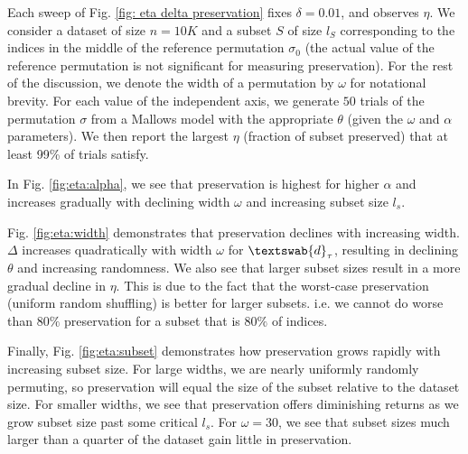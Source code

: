 Each sweep of Fig. \ref{fig: eta delta preservation} fixes $\delta = 0.01$, and observes $\eta$. We consider a dataset of size $n = 10K$ and a subset $S$ of size $l_S$ corresponding to the indices in the middle of the reference permutation $\sigma_0$ (the actual value of the reference permutation is not significant for measuring preservation). For the rest of the discussion, we denote the width of a permutation by $\omega$ for notational brevity. For each value of the independent axis, we generate $50$ trials of the permutation $\sigma$ from a Mallows model with the appropriate $\theta$ (given the $\omega$ and $\alpha$ parameters). We then report the largest $\eta$ (fraction of subset preserved) that at least 99\% of trials satisfy. 

In Fig. \ref{fig:eta:alpha}, we see that preservation is highest for higher $\alpha$ and increases gradually with declining width $\omega$ and increasing subset size $l_s$. 

Fig. \ref{fig:eta:width} demonstrates that preservation declines with increasing width. $\Delta$ increases quadratically with width $\omega$ for $\textswab{d}_\tau$, resulting in declining $\theta$ and increasing randomness. We also see that larger subset sizes result in a more gradual decline in $\eta$. This is due to the fact that the worst-case preservation (uniform random shuffling) is better for larger subsets. i.e. we cannot do worse than $80\%$ preservation for a subset that is $80\%$ of indices. 

Finally, Fig. \ref{fig:eta:subset} demonstrates how preservation grows rapidly with increasing subset size. For large widths, we are nearly uniformly randomly permuting, so preservation will equal the size of the subset relative to the dataset size. For smaller widths, we see that preservation offers diminishing returns as we grow subset size past some critical $l_s$. For $\omega = 30$, we see that subset sizes much larger than a quarter of the dataset gain little in preservation. 

